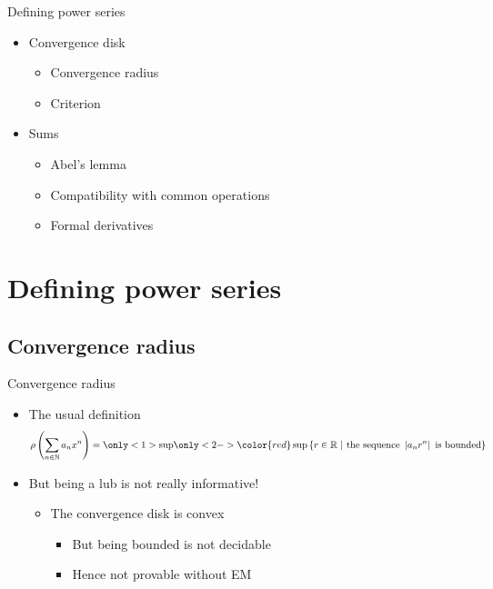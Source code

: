 \documentclass{beamer}
\begin{document}
\begin{frame}{Defining power series}
\begin{itemize}
\item Convergence disk
  \begin{itemize}
    \item Convergence radius
    \item Criterion
  \end{itemize}
\item Sums
  \begin{itemize}
    \item Abel's lemma
    \item Compatibility with common operations
    \item Formal derivatives
  \end{itemize}
\end{itemize}
\end{frame}

\section{Defining power series}

\subsection{Convergence radius}

\begin{frame}{Convergence radius}
\begin{itemize}
  \item The usual definition
    $$\rho\left(\sum_{n \in \N} a_n x^n\right) = \only<1>{\sup}
    \only<2->{{\color{red} \sup }} \left\lbrace
     r \in \R ~|~\text{the sequence } \left|a_n r^n\right|
     \text{ is bounded}\right\rbrace$$
  \item<2-> But being a lub is not really informative!
  \begin{itemize}
    \item<3-> The convergence disk is convex
    \begin{itemize}
      \item<4-> But being bounded is not decidable
      \item<5-> Hence not provable without EM
    \end{itemize}
  \end{itemize}
\end{itemize}
\end{frame}
\end{document}
